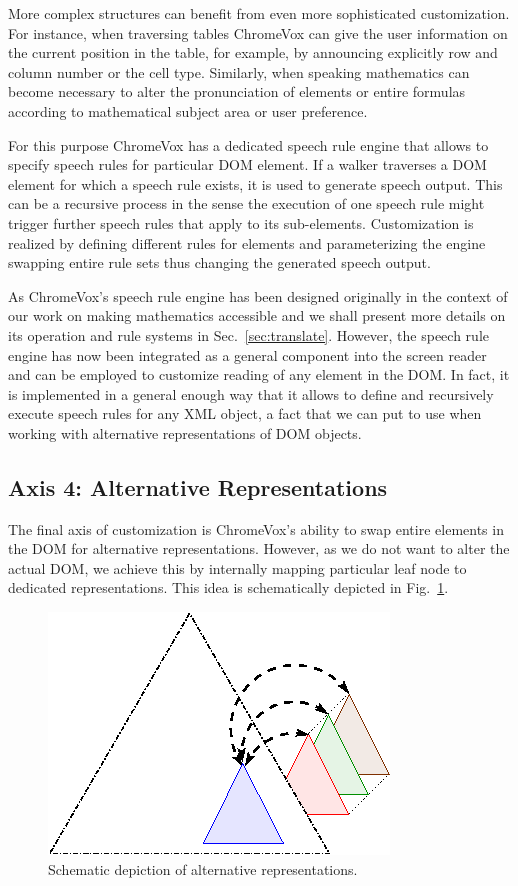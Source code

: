 \documentclass{sig-alternate}
\begin{document}
More complex structures can benefit from even more sophisticated customization.
For instance, when traversing tables ChromeVox can give the user information on
the current position in the table, for example, by announcing explicitly row and
column number or the cell type. Similarly, when speaking mathematics can become
necessary to alter the pronunciation of elements or entire formulas according to
mathematical subject area or user preference.

For this purpose ChromeVox has a dedicated speech rule engine that allows to
specify speech rules for particular DOM element. If a walker traverses a DOM
element for which a speech rule exists, it is used to generate speech
output. This can be a recursive process in the sense the execution of one speech
rule might trigger further speech rules that apply to its sub-elements.
Customization is realized by defining different rules for elements and
parameterizing the engine swapping entire rule sets thus changing the generated
speech output.

As ChromeVox's speech rule engine has been designed originally in the context of
our work on making mathematics accessible and we shall present more details on
its operation and rule systems in Sec.~\ref{sec:translate}. However, the speech
rule engine has now been integrated as a general component into the screen
reader and can be employed to customize reading of any element in the DOM. In
fact, it is implemented in a general enough way that it allows to define and
recursively execute speech rules for any XML object, a fact that we can put to
use when working with alternative representations of DOM objects.


\subsection{Axis 4: Alternative Representations}
\label{sec:ax4}


The final axis of customization is ChromeVox's ability to swap entire elements
in the DOM for alternative representations. However, as we do not want to alter
the actual DOM, we achieve this by internally mapping particular leaf node to
dedicated representations. This idea is schematically depicted in
Fig.~\ref{fig:alt}.

\begin{figure}[ht!]
  \begin{center}
    \leavevmode
    \includegraphics[width=.5\columnwidth]{images/substructure1}
    \caption{Schematic depiction of alternative representations.}
    \label{fig:alt}
  \end{center}
\end{figure}
\end{document}
